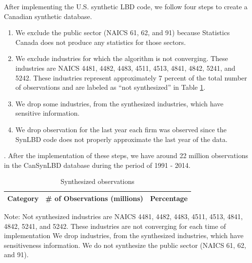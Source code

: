\documentclass{article}
\begin{document}
After implementing the U.S. synthetic LBD code, we follow four steps to create a Canadian synthetic database. \begin{enumerate}
    \item We exclude the public sector (NAICS 61, 62, and 91) because Statistics Canada does not produce any statistics for those sectors.
    \item We exclude industries for which the algorithm is not converging.%
    These industries are NAICS 4481,    4482,     4483,     4511,     4513,     4841,     4842,     5241, and 5242. These industries represent approximately 7 percent of the total number of observations and are labeled as ``not synthesized'' in Table \ref{Synthesized_observations}.
    \item We drop some industries, from the synthesized industries, which have sensitive information.
    \item We drop observation for the last year each firm was observed since the SynLBD code does not properly approximate the last year of the data.
\end{enumerate}. 
After the implementation of these steps, we have around 22 million observations in the CanSynLBD database during the period of 1991 - 2014.

\begin{table}[H]
  \centering
\begin{threeparttable}
  \caption{Synthesized observations}  \label{Synthesized_observations} \medskip
  \renewcommand{\arraystretch}{1}
  \begin{tabular}{l  c c }
    \toprule
    \textbf{Category}&\textbf{\# of Observations (millions)}&\textbf{Percentage}\\
    \midrule

   \bottomrule
  \end{tabular} 
\begin{tablenotes}
\small
\item Note: Not synthesized industries are NAICS 4481,    4482,     4483,     4511,     4513,     4841,     4842,     5241, and 5242. These industries are not converging for each time of implementation We drop industries, from the synthesized industries, which have sensitiveness information. We do not synthesize the public sector (NAICS 61, 62, and 91).
 \end{tablenotes}
 \end{threeparttable}
\end{table}
\end{document}
